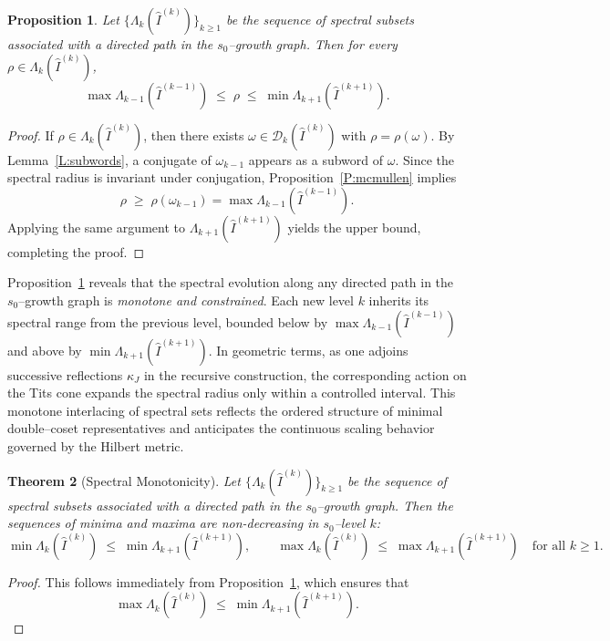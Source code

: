\documentclass[11pt]{amsart}
\numberwithin{equation}{section}
\newtheorem{thm}{Theorem}[section]
\newtheorem{prop}[thm]{Proposition}
\begin{document}
\begin{prop}\label{P:spectral-inequality}
Let $\{\Lambda_k(\widehat I^{(k)})\}_{k\ge1}$ be the sequence of
spectral subsets associated with a directed path in the
$s_0$--growth graph.
Then for every $\rho\in\Lambda_k(\widehat I^{(k)})$,
\[
\max \Lambda_{k-1}(\widehat I^{(k-1)})
\;\le\;
\rho
\;\le\;
\min \Lambda_{k+1}(\widehat I^{(k+1)}).
\]
\end{prop}

\begin{proof}
If $\rho\in\Lambda_k(\widehat I^{(k)})$, then there exists
$\omega\in\mathcal{D}_k(\widehat I^{(k)})$ with $\rho=\rho(\omega)$.
By Lemma~\ref{L:subwords}, a conjugate of $\omega_{k-1}$ appears as
a subword of $\omega$.  Since the spectral radius is invariant under
conjugation, Proposition~\ref{P:mcmullen} implies
\[
\rho \;\ge\; \rho(\omega_{k-1})
=\max \Lambda_{k-1}(\widehat I^{(k-1)}).
\]
Applying the same argument to $\Lambda_{k+1}(\widehat I^{(k+1)})$
yields the upper bound, completing the proof.
\end{proof}

\medskip
Proposition~\ref{P:spectral-inequality} reveals that the spectral
evolution along any directed path in the $s_0$--growth graph
is \emph{monotone and constrained}.
Each new level $k$ inherits its spectral range from the previous level,
bounded below by $\max\Lambda_{k-1}(\widehat I^{(k-1)})$
and above by $\min\Lambda_{k+1}(\widehat I^{(k+1)})$.
In geometric terms, as one adjoins successive reflections
$\kappa_J$ in the recursive construction,
the corresponding action on the Tits cone
expands the spectral radius only within a controlled interval.
This monotone interlacing of spectral sets
reflects the ordered structure of minimal double--coset representatives
and anticipates the continuous scaling behavior
governed by the Hilbert metric.


\begin{thm}[Spectral Monotonicity]\label{T:monotonicity}
Let $\{\Lambda_k(\widehat I^{(k)})\}_{k\ge1}$ be the sequence of
spectral subsets associated with a directed path in the
$s_0$--growth graph. Then the sequences of minima and maxima are non-decreasing in $s_0$--level $k$:
\[
\min \Lambda_k(\widehat I^{(k)})\;\le\;
\min \Lambda_{k+1}(\widehat I^{(k+1)}), \qquad
\max \Lambda_k(\widehat I^{(k)})\;\le\;
\max \Lambda_{k+1}(\widehat I^{(k+1)})
\quad \text{for all } k \ge 1.
\]
\end{thm}

\begin{proof}
This follows immediately from Proposition~\ref{P:spectral-inequality}, which ensures that
\[
\max \Lambda_k(\widehat I^{(k)}) \;\le\;
\min \Lambda_{k+1}(\widehat I^{(k+1)}).
\]
\end{proof}
\end{document}
